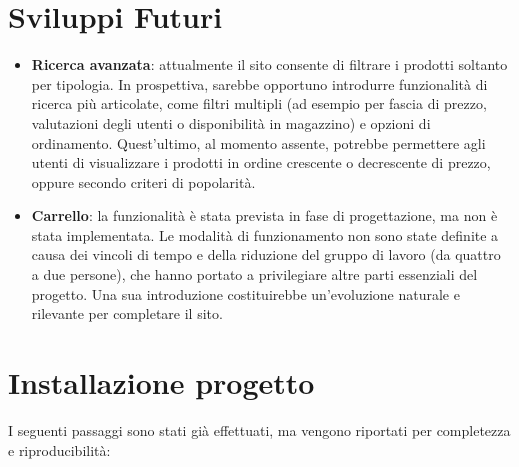 \section{Sviluppi Futuri}

\begin{itemize}
  \item \textbf{Ricerca avanzata}: attualmente il sito consente di filtrare i prodotti soltanto per tipologia. In prospettiva, sarebbe opportuno introdurre funzionalità di ricerca più articolate, come filtri multipli (ad esempio per fascia di prezzo, valutazioni degli utenti o disponibilità in magazzino) e opzioni di ordinamento. Quest’ultimo, al momento assente, potrebbe permettere agli utenti di visualizzare i prodotti in ordine crescente o decrescente di prezzo, oppure secondo criteri di popolarità.
  
  \item \textbf{Carrello}: la funzionalità è stata prevista in fase di progettazione, ma non è stata implementata. Le modalità di funzionamento non sono state definite a causa dei vincoli di tempo e della riduzione del gruppo di lavoro (da quattro a due persone), che hanno portato a privilegiare altre parti essenziali del progetto. Una sua introduzione costituirebbe un’evoluzione naturale e rilevante per completare il sito.
\end{itemize}
\clearpage
\section{Installazione progetto}

I seguenti passaggi sono stati già effettuati, ma vengono riportati per completezza e riproducibilità:

